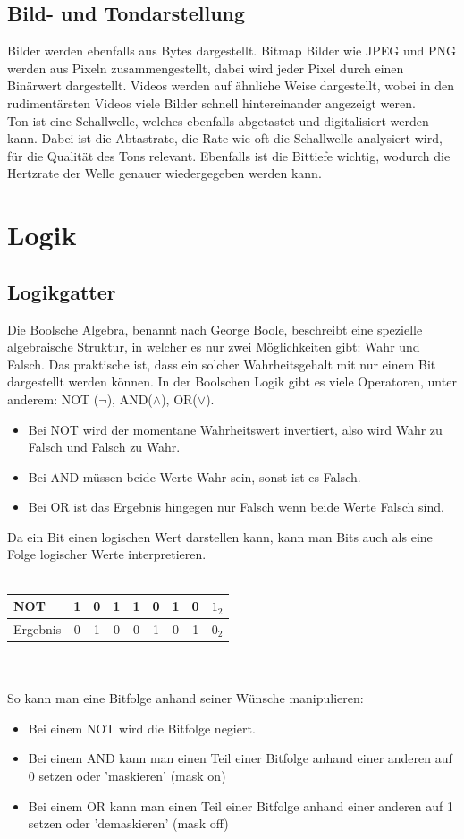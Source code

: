 \documentclass{article}
\begin{document}
		\subsection{Bild- und Tondarstellung}
		Bilder werden ebenfalls aus Bytes dargestellt. Bitmap Bilder wie JPEG und PNG werden aus Pixeln zusammengestellt, dabei wird jeder Pixel durch einen Binärwert dargestellt. Videos werden auf ähnliche Weise dargestellt, wobei in den rudimentärsten Videos viele Bilder schnell hintereinander angezeigt weren. \\
		Ton ist eine Schallwelle, welches ebenfalls abgetastet und digitalisiert werden kann. Dabei ist die Abtastrate, die Rate wie oft die Schallwelle analysiert wird, für die Qualität des Tons relevant. Ebenfalls ist die Bittiefe wichtig, wodurch die Hertzrate der Welle genauer wiedergegeben werden kann.
		\section{Logik}
		\subsection{Logikgatter}
		Die Boolsche Algebra, benannt nach George Boole, beschreibt eine spezielle algebraische Struktur, in welcher es nur zwei Möglichkeiten gibt: Wahr und Falsch. Das praktische ist, dass ein solcher Wahrheitsgehalt mit nur einem Bit dargestellt werden können. In der Boolschen Logik gibt es viele Operatoren, unter anderem: NOT ($\neg$), AND($\land$), OR($\lor$). \\
		\begin{itemize}
			\item{Bei NOT wird der momentane Wahrheitswert invertiert, also wird Wahr zu Falsch und Falsch zu Wahr.}
			\item{Bei AND müssen beide Werte Wahr sein, sonst ist es Falsch.}
			\item{Bei OR ist das Ergebnis hingegen nur Falsch wenn beide Werte Falsch sind.}
		\end{itemize}
		Da ein Bit einen logischen Wert darstellen kann, kann man Bits auch als eine Folge logischer Werte interpretieren. \\ \\
		\begin{tabular}{l|c|c|c|c|c|c|c|c}
			NOT&1&0&1&1&0&1&0&$1_2$ \\ \hline
			Ergebnis&0&1&0&0&1&0&1&$0_2$
		\end{tabular} \\ \\
		So kann man eine Bitfolge anhand seiner Wünsche manipulieren:
		\begin{itemize}
			\item{Bei einem NOT wird die Bitfolge negiert.}
			\item{Bei einem AND kann man einen Teil einer Bitfolge anhand einer anderen auf 0 setzen oder 'maskieren' (mask on)}
			\item{Bei einem OR kann man einen Teil einer Bitfolge anhand einer anderen auf 1 setzen oder 'demaskieren' (mask off)}
		\end{itemize}
\end{document}
